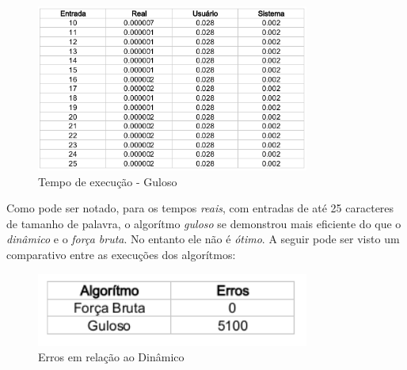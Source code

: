 \begin{figure}[H]
    \begin{center}
        \includegraphics[width=0.8\textwidth,natwidth=610,natheight=642]{doc/greedy-time-test.png}
        \caption{Tempo de execução - Guloso}
        \label{fig:greedytime}
    \end{center}
\end{figure}

Como pode ser notado, para os tempos {\it reais}, com entradas de até 25 
caracteres de tamanho de palavra, o algorítmo \emph{guloso} se demonstrou
mais eficiente do que o \emph{dinâmico} e o \emph{força bruta}. No entanto
ele não é \emph{ótimo}. A seguir pode ser visto um comparativo entre as 
execuções dos algorítmos: 

\begin{figure}[H]
    \begin{center}
        \includegraphics[width=0.8\textwidth,natwidth=610,natheight=642]{doc/errors.png}
        \caption{Erros em relação ao Dinâmico}
        \label{fig:errors}
    \end{center}
\end{figure}


